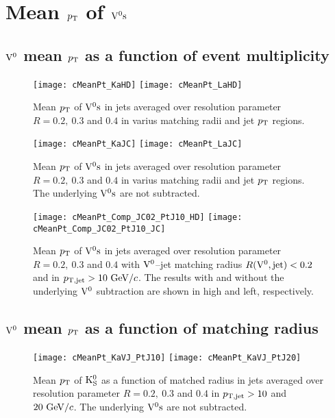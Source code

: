 \documentclass[12pt]{article}
\begin{document}
\newpage
\section{Mean $p_{\rm T}$ of ${\rm V}^{0}{\rm s}$}

\subsection{${\rm V}^{0}$ mean $p_{\rm T}$ as a function of event multiplicity}

\begin{figure}[htbp]
\centering
\texttt{[image: cMeanPt\_KaHD]}
\texttt{[image: cMeanPt\_LaHD]}
\caption{Mean $p_{\rm T}$ of ${\rm V}^{0}{\rm s}$ in jets averaged over resolution parameter $R=0.2,~0.3$
and $0.4$ in varius matching radii and jet $p_{\rm T}$ regions.}
\label{fig:s02MeanPtHD}
\end{figure}

\begin{figure}[htbp]
\centering
\texttt{[image: cMeanPt\_KaJC]}
\texttt{[image: cMeanPt\_LaJC]}
\caption{Mean $p_{\rm T}$ of ${\rm V}^{0}{\rm s}$ in jets averaged over resolution parameter $R=0.2,~0.3$
and $0.4$ in varius matching radii and jet $p_{\rm T}$ regions.
The underlying ${\rm V}^{0}{\rm s}$ are not subtracted.}
\label{fig:s03MeanPtJC}
\end{figure}

\begin{figure}[htbp]
\centering
\texttt{[image: cMeanPt\_Comp\_JC02\_PtJ10\_HD]}
\texttt{[image: cMeanPt\_Comp\_JC02\_PtJ10\_JC]}
\caption{Mean $p_{\rm T}$ of ${\rm V}^{0}{\rm s}$ in jets averaged over resolution parameter $R=0.2,~0.3$
and $0.4$ with ${\rm V}^{0}$--jet matching radius $R({\rm V}^{0},{\rm jet})<0.2$ and
in $p_{\rm T,jet}>10~{\rm GeV}/c$.
The results with and without
the underlying ${\rm V}^{0}$ subtraction are shown in high and left, respectively.}
\label{fig:s03MeanComp}
\end{figure}

\newpage
\subsection{${\rm V}^{0}$ mean $p_{\rm T}$ as a function of matching radius}

\begin{figure}[htbp]
\centering
\texttt{[image: cMeanPt\_KaVJ\_PtJ10]}
\texttt{[image: cMeanPt\_KaVJ\_PtJ20]}
\caption{Mean $p_{\rm T}$ of ${\rm K}_{\rm S}^{0}$ as a function of matched radius
in jets averaged over resolution parameter $R=0.2,~0.3$
and $0.4$ in $p_{\rm T,jet}>10$ and $20~{\rm GeV}/c$.
The underlying ${\rm V}^{0}{\rm s}$ are not subtracted.}
\label{fig:s03MeanKaVJ}
\end{figure}
\end{document}

